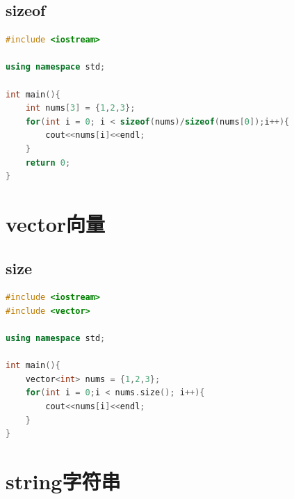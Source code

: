 \documentclass[12pt,twiside,a4paper]{ctexbook}
\numberwithin{chapter}{part}
\begin{document}
\section{sizeof}
\begin{lstlisting}[language=C++]
#include <iostream>

using namespace std;

int main(){
	int nums[3] = {1,2,3};
	for(int i = 0; i < sizeof(nums)/sizeof(nums[0]);i++){
		cout<<nums[i]<<endl;
	}
	return 0;
}
\end{lstlisting}

\chapter{vector向量}
\section{size}
\begin{lstlisting}[language=C++]
#include <iostream>
#include <vector>

using namespace std;

int main(){
	vector<int> nums = {1,2,3};
	for(int i = 0;i < nums.size(); i++){
		cout<<nums[i]<<endl;
	}
}
\end{lstlisting}

\chapter{string字符串}
\end{document}
